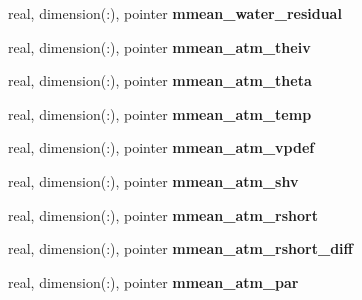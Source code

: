 \begin{DoxyCompactItemize}
\item 
\hypertarget{structed__state__vars_1_1edtype_a0f6df0cd88569160d0b2ad7703c4c0dc}{
real, dimension(:), pointer {\bfseries mmean\_\-water\_\-residual}}
\label{structed__state__vars_1_1edtype_a0f6df0cd88569160d0b2ad7703c4c0dc}

\item 
\hypertarget{structed__state__vars_1_1edtype_a156105b161dda1187e8594b2bf0517f0}{
real, dimension(:), pointer {\bfseries mmean\_\-atm\_\-theiv}}
\label{structed__state__vars_1_1edtype_a156105b161dda1187e8594b2bf0517f0}

\item 
\hypertarget{structed__state__vars_1_1edtype_ac88f31ccbc5bb38bb1027da2c550b864}{
real, dimension(:), pointer {\bfseries mmean\_\-atm\_\-theta}}
\label{structed__state__vars_1_1edtype_ac88f31ccbc5bb38bb1027da2c550b864}

\item 
\hypertarget{structed__state__vars_1_1edtype_acfdcf40a37c17aaf4cb3a0e5e7f6dd3d}{
real, dimension(:), pointer {\bfseries mmean\_\-atm\_\-temp}}
\label{structed__state__vars_1_1edtype_acfdcf40a37c17aaf4cb3a0e5e7f6dd3d}

\item 
\hypertarget{structed__state__vars_1_1edtype_a15a38df34eba86be5434692adb2999c8}{
real, dimension(:), pointer {\bfseries mmean\_\-atm\_\-vpdef}}
\label{structed__state__vars_1_1edtype_a15a38df34eba86be5434692adb2999c8}

\item 
\hypertarget{structed__state__vars_1_1edtype_a1cda07411c2151491434df1b9d0a8d77}{
real, dimension(:), pointer {\bfseries mmean\_\-atm\_\-shv}}
\label{structed__state__vars_1_1edtype_a1cda07411c2151491434df1b9d0a8d77}

\item 
\hypertarget{structed__state__vars_1_1edtype_a2075ed6941a628ac7e5b728712099931}{
real, dimension(:), pointer {\bfseries mmean\_\-atm\_\-rshort}}
\label{structed__state__vars_1_1edtype_a2075ed6941a628ac7e5b728712099931}

\item 
\hypertarget{structed__state__vars_1_1edtype_a41daa87e4b812e9279b22fc8700c8204}{
real, dimension(:), pointer {\bfseries mmean\_\-atm\_\-rshort\_\-diff}}
\label{structed__state__vars_1_1edtype_a41daa87e4b812e9279b22fc8700c8204}

\item 
\hypertarget{structed__state__vars_1_1edtype_a16f9dd29aa4a022c4db0c688ec9cd4f5}{
real, dimension(:), pointer {\bfseries mmean\_\-atm\_\-par}}
\label{structed__state__vars_1_1edtype_a16f9dd29aa4a022c4db0c688ec9cd4f5}


\end{DoxyCompactItemize}
